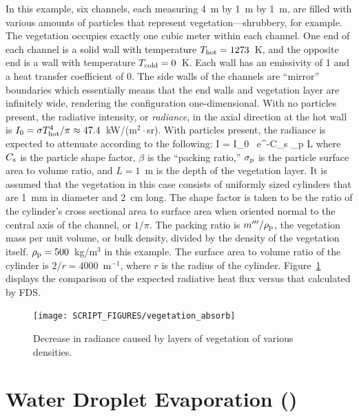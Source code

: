 \documentclass[11pt]{book}
\begin{document}
In this example, six channels, each measuring 4~m by 1~m by 1~m, are filled with various amounts of particles that represent vegetation---shrubbery, for example. The vegetation occupies exactly one cubic meter within each channel. One end of each channel is a solid wall with temperature $T_{\rm hot}= 1273$~K, and the opposite end is a wall with temperature $T_{\rm cold}=0$~K. Each wall has an emissivity of 1 and a heat transfer coefficient of 0. The side walls of the channels are ``mirror'' boundaries which essentially means that the end walls and vegetation layer are infinitely wide, rendering the configuration one-dimensional. With no particles present, the radiative intensity, or {\em radiance}, in the axial direction at the hot wall is $I_0=\sigma T_{\rm hot}^4/\pi \approx 47.4$~kW/(m$^2 \cdot$sr). With particles present, the radiance is expected to attenuate according to the following:
\be
   I = I_0 \, \hbox{e}^{-C_{\rm s} \beta \sigma_{\rm p} L}
\ee
where $C_{\rm s}$ is the particle shape factor, $\beta$ is the ``packing ratio,'' $\sigma_{\rm p}$ is the particle surface area to volume ratio, and $L=1$~m is the depth of the vegetation layer. It is assumed that the vegetation in this case consists of uniformly sized cylinders that are 1~mm in diameter and 2~cm long. The shape factor is taken to be the ratio of the cylinder's cross sectional area to surface area when oriented normal to the central axis of the channel, or $1/\pi$. The packing ratio is $m'''/\rho_{\rm p}$, the vegetation mass per unit volume, or bulk density, divided by the density of the vegetation itself. $\rho_{\rm p}=500$~kg/m$^3$ in this example. The surface area to volume ratio of the cylinder is $2/r=4000$~m$^{-1}$, where $r$ is the radius of the cylinder. Figure~\ref{vegetation_absorb_fig} displays the comparison of the expected radiative heat flux versus that calculated by FDS.
\begin{figure}[!ht]
\centering
\texttt{[image: SCRIPT\_FIGURES/vegetation\_absorb]}
\caption[Results of the  test case.]{Decrease in radiance caused by layers of vegetation of various densities.}
\label{vegetation_absorb_fig}
\end{figure}


\clearpage

\section{Water Droplet Evaporation (\texorpdfstring{{}}{water\_evaporation}) }
\label{water_evaporation}
\end{document}
